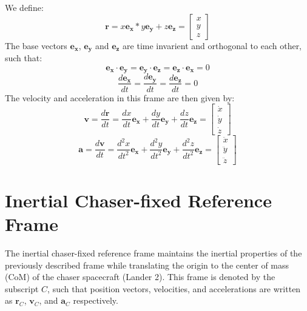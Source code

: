 We define:
\begin{equation}
    \mathbf{r} = x \mathbf{e_x} * y \mathbf{e_y} + z \mathbf{e_z} = \begin{bmatrix} x \\ y \\ z \end{bmatrix}
\end{equation}
The base vectors $\mathbf{e_x}$, $\mathbf{e_y}$ and $\mathbf{e_z}$ are time invarient and orthogonal to each other, such that:
\begin{equation}
    \mathbf{e_x} \cdot \mathbf{e_y} = \mathbf{e_y} \cdot \mathbf{e_z} = \mathbf{e_z} \cdot \mathbf{e_x} = 0
\end{equation}
\begin{equation}
    \frac{d \mathbf{e_x}}{dt} = \frac{d \mathbf{e_y}}{dt} = \frac{d \mathbf{e_z}}{dt} = 0
\end{equation}
The velocity and acceleration in this frame are then given by:
\begin{equation}
    \mathbf{v} = \frac{d\mathbf{r}}{dt} = \frac{dx}{dt} \mathbf{e_x} + \frac{dy}{dt} \mathbf{e_y} + \frac{dz}{dt} \mathbf{e_z} = \begin{bmatrix} \dot{x} \\ \dot{y} \\ \dot{z} \end{bmatrix}
\end{equation}
\begin{equation}
    \mathbf{a} = \frac{d\mathbf{v}}{dt} = \frac{d^2x}{dt^2} \mathbf{e_x} + \frac{d^2y}{dt^2} \mathbf{e_y} + \frac{d^2z}{dt^2} \mathbf{e_z} = \begin{bmatrix} \ddot{x} \\ \ddot{y} \\ \ddot{z} \end{bmatrix}
\end{equation}

\section{Inertial Chaser-fixed Reference Frame}

The inertial chaser-fixed reference frame maintains the inertial properties of the previously described frame while translating the origin to the center of mass (CoM) of the chaser spacecraft (Lander 2). This frame is denoted by the subscript $C$, such that position vectors, velocities, and accelerations are written as $\mathbf{r}_C$, $\mathbf{v}_C$, and $\mathbf{a}_C$ respectively.

